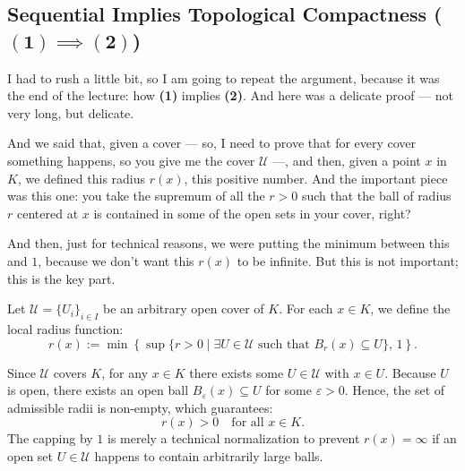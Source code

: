\begin{proofWrapper}

\subsection{Sequential Implies Topological Compactness (\texorpdfstring{$\mathbf{(1)} \implies \mathbf{(2)}$}{(1) => (2)})}

\begin{speech}[00:01:45 - 00:03:00]
I had to rush a little bit, so I am going to repeat the argument, because it was the end of the lecture: how \textbf{(1)} implies \textbf{(2)}. And here was a delicate proof --- not very long, but delicate.

And we said that, given a cover --- so, I need to prove that for every cover something happens, so you give me the cover $\mathcal{U}$ ---, and then, given a point $x$ in $K$, we defined this radius $r(x)$, this positive number. And the important piece was this one: you take the supremum of all the $r > 0$ such that the ball of radius $r$ centered at $x$ is contained in some of the open sets in your cover, right?

And then, just for technical reasons, we were putting the minimum between this and $1$, because we don't want this $r(x)$ to be infinite. But this is not important; this is the key part.
\end{speech}

\begin{content}
Let $\mathcal{U} = \{U_i\}_{i \in I}$ be an arbitrary open cover of $K$. For each $x \in K$, we define the local radius function:
\begin{equation}\label{eq:radius-function}
r(x) := \min \left\{ \sup \bigl\{ r > 0 \;\big|\; \exists U \in \mathcal{U} \text{ such that } B_r(x) \subseteq U \bigr\}, \, 1 \right\}.
\end{equation}

\begin{steps}
Since $\mathcal{U}$ covers $K$, for any $x \in K$ there exists some $U \in \mathcal{U}$ with $x \in U$. Because $U$ is open, there exists an open ball $B_\varepsilon(x) \subseteq U$ for some $\varepsilon > 0$. Hence, the set of admissible radii is non-empty, which guarantees:
\[
r(x) > 0 \quad \text{for all } x \in K.
\]
The capping by $1$ is merely a technical normalization to prevent $r(x) = \infty$ if an open set $U \in \mathcal{U}$ happens to contain arbitrarily large balls.
\end{steps}
\end{content}


\end{proofWrapper}
